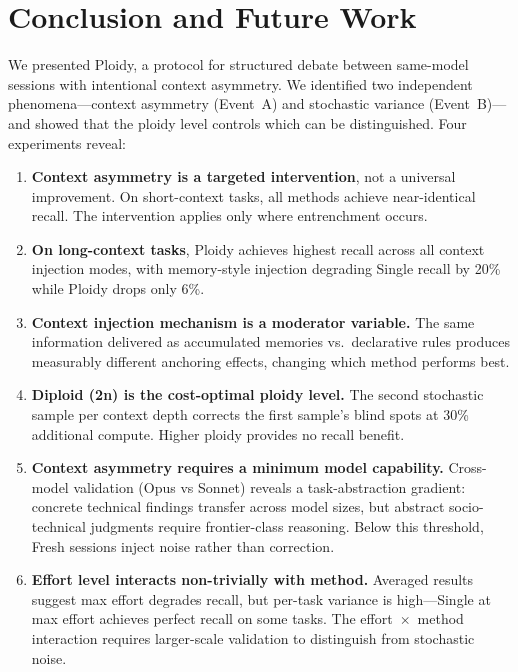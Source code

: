 \documentclass[11pt]{article}
\begin{document}
\section{Conclusion and Future Work}
\label{sec:conclusion}

We presented Ploidy, a protocol for structured debate between same-model sessions with intentional context asymmetry. We identified two independent phenomena---context asymmetry (Event~A) and stochastic variance (Event~B)---and showed that the ploidy level controls which can be distinguished. Four experiments reveal:

\begin{enumerate}[label=\arabic*., leftmargin=1.5em]
  \item \textbf{Context asymmetry is a targeted intervention}, not a universal improvement. On short-context tasks, all methods achieve near-identical recall. The intervention applies only where entrenchment occurs.
  \item \textbf{On long-context tasks}, Ploidy achieves highest recall across all context injection modes, with memory-style injection degrading Single recall by 20\% while Ploidy drops only 6\%.
  \item \textbf{Context injection mechanism is a moderator variable.} The same information delivered as accumulated memories vs.\ declarative rules produces measurably different anchoring effects, changing which method performs best.
  \item \textbf{Diploid (2n) is the cost-optimal ploidy level.} The second stochastic sample per context depth corrects the first sample's blind spots at 30\% additional compute. Higher ploidy provides no recall benefit.
  \item \textbf{Context asymmetry requires a minimum model capability.} Cross-model validation (Opus vs Sonnet) reveals a task-abstraction gradient: concrete technical findings transfer across model sizes, but abstract socio-technical judgments require frontier-class reasoning. Below this threshold, Fresh sessions inject noise rather than correction.
  \item \textbf{Effort level interacts non-trivially with method.} Averaged results suggest max effort degrades recall, but per-task variance is high---Single at max effort achieves perfect recall on some tasks. The effort~$\times$~method interaction requires larger-scale validation to distinguish from stochastic noise.
\end{enumerate}
\end{document}
